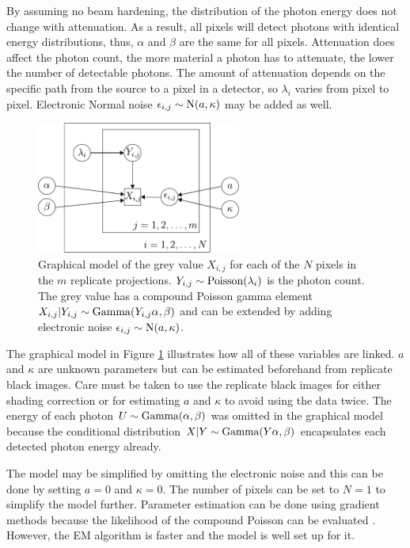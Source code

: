 By assuming no beam hardening, the distribution of the photon energy does not change with attenuation. As a result, all pixels will detect photons with identical energy distributions, thus, $\alpha$ and $\beta$ are the same for all pixels. Attenuation does affect the photon count, the more material a photon has to attenuate, the lower the number of detectable photons. The amount of attenuation depends on the specific path from the source to a pixel in a detector, so $\lambda_i$ varies from pixel to pixel. Electronic Normal noise $\epsilon_{i,j}\sim\operatorname{N}(a,\kappa)$ may be added as well.

\begin{figure}
  \centering
  \includegraphics[width=0.6\textwidth]{../figures/compoundpoisson/graphicalModel.pdf}
  \caption{Graphical model of the grey value $X_{i,j}$ for each of the $N$ pixels in the $m$ replicate projections. $Y_{i,j}\sim\operatorname{Poisson}(\lambda_i)$ is the photon count. The grey value has a compound Poisson gamma element $X_{i,j}|Y_{i,j}\sim\operatorname{Gamma}(Y_{i,j}\alpha,\beta)$ and can be extended by adding electronic noise $\epsilon_{i,j}\sim\operatorname{N}(a,\kappa)$.}
  \label{fig:compoundPoisson_graphicalModel}
\end{figure}

The graphical model in Figure \ref{fig:compoundPoisson_graphicalModel} illustrates how all of these variables are linked. $a$ and $\kappa$ are unknown parameters but can be estimated beforehand from replicate black images. Care must be taken to use the replicate black images for either shading correction or for estimating $a$ and $\kappa$ to avoid using the data twice. The energy of each photon $U\sim\operatorname{Gamma}(\alpha,\beta)$ was omitted in the graphical model because the conditional distribution $X|Y\sim\operatorname{Gamma}(Y\alpha,\beta)$ encapsulates each detected photon energy already.

The model may be simplified by omitting the electronic noise and this can be done by setting $a=0$ and $\kappa=0$. The number of pixels can be set to $N=1$ to simplify the model further. Parameter estimation can be done using gradient methods because the likelihood of the compound Poisson can be evaluated \citep{dunn2005series}. However, the EM algorithm is faster and the model is well set up for it.

